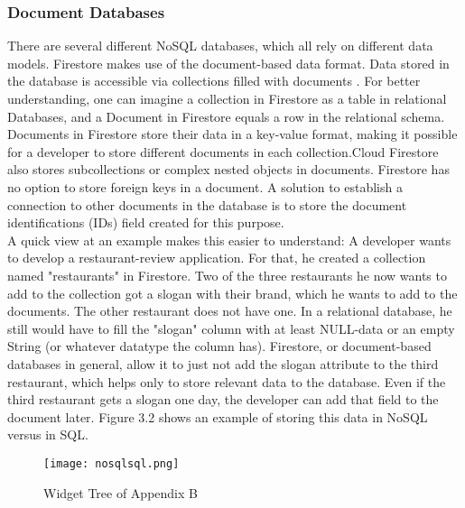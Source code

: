 \subsubsection{Document Databases}
There are several different NoSQL databases, which all rely on different data models. Firestore makes use of the document-based data format. Data stored in the database is accessible via collections filled with documents \cite{.firestore}. For better understanding, one can imagine a collection in Firestore as a table in relational Databases, and a Document in Firestore equals a row in the relational schema. Documents in Firestore store their data in a key-value format, making it possible for a developer to store different documents in each collection.Cloud Firestore also stores subcollections or complex nested objects in documents. Firestore has no option to store foreign keys in a document. A solution to establish a connection to other documents in the database is to store the document identifications (IDs) field created for this purpose. 
\newline \\
A quick view at an example makes this easier to understand: A developer wants to develop a restaurant-review application. For that, he created a collection named "restaurants" in Firestore. Two of the three restaurants he now wants to add to the collection got a slogan with their brand, which he wants to add to the documents. The other restaurant does not have one. In a relational database, he still would have to fill the "slogan" column with at least NULL-data or an empty String (or whatever datatype the column has). Firestore, or document-based databases in general, allow it to just not add the slogan attribute to the third restaurant, which helps only to store relevant data to the database. Even if the third restaurant gets a slogan one day, the developer can add that field to the document later. Figure 3.2 shows an example of storing this data in NoSQL versus in SQL.
\begin{figure}[H]
	\centering
	\texttt{[image: nosqlsql.png]}
	\caption[Widget Tree of Listing 2.1]{Widget Tree of Appendix B}
\end{figure}